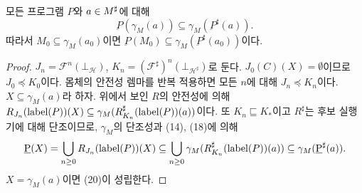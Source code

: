 \documentclass[a4paper,10pt]{article}
\begin{document}
\begin{theorem}
모든 프로그램 $P$와 $a\in M^\sharp$에 대해
\[
 \underbar{P}(\gamma_M(a))\subseteq\gamma_M(\underbar{P}^\sharp(a)).             \tag{20}
\]
따라서 $M_0\subseteq\gamma_M(a_0)$이면
$\underbar{P}(M_0)\subseteq\gamma_M(\underbar{P}^\sharp(a_0))$이다.
\end{theorem}
\begin{proof}
$J_n=\mathcal F^n(\bot_{\mathcal H})$,
$K_n=(\mathcal F^\sharp)^n(\bot_{\mathcal H^\sharp})$로 둔다.
$J_0(C)(X)=\emptyset$이므로 $J_0\preceq K_0$이다.
몸체의 안전성 렘마를 반복 적용하면 모든 $n$에 대해 $J_n\preceq K_n$이다.
$X\subseteq\gamma_M(a)$라 하자. 위에서 보인 $R$의 안전성에 의해
$R_{J_n}(\operatorname{label}(P))(X)\subseteq\gamma_M(R^\sharp_{K_n}(\operatorname{label}(P))(a))$이다.
또 $K_n\sqsubseteq K_*$이고 $R^\sharp$는 후보 실행기에 대해 단조이므로,
$\gamma_M$의 단조성과 (14), (18)에 의해
\[
 \underbar{P}(X)=\bigcup_{n\ge0}R_{J_n}(\operatorname{label}(P))(X)
 \subseteq\bigcup_{n\ge0}\gamma_M(R^\sharp_{K_n}(\operatorname{label}(P))(a))
 \subseteq\gamma_M(\underbar{P}^\sharp(a)).
\]
$X=\gamma_M(a)$이면 (20)이 성립한다.
\end{proof}
\end{document}

